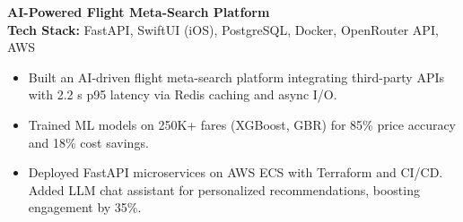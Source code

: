\documentclass[letterpaper,10.5pt]{article}
\begin{document}
\textbf{AI-Powered Flight Meta-Search Platform} \hfill \\
\textbf{Tech Stack:} FastAPI, SwiftUI (iOS), PostgreSQL, Docker, OpenRouter API, AWS
\begin{itemize}\itemsep 1pt
  \item Built an AI-driven flight meta-search platform integrating third-party APIs with 2.2 s p95 latency via Redis caching and async I/O. 
  \item Trained ML models on 250K+ fares (XGBoost, GBR) for 85\% price accuracy and 18\% cost savings.
  \item Deployed FastAPI microservices on AWS ECS with Terraform and CI/CD. Added LLM chat assistant for personalized recommendations, boosting engagement by 35\%.
\end{itemize}
\end{document}
